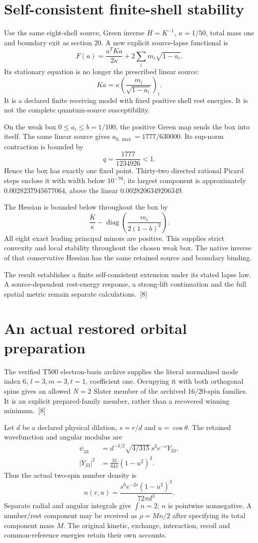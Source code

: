 \documentclass[10pt,twocolumn,letterpaper]{article}
\begin{document}
\section{Self-consistent finite-shell stability}
Use the same eight-shell source, Green inverse $H=K^{-1}$, $\kappa=1/50$, total mass one and boundary exit as section 20. A new explicit source-lapse functional is
\[
F(a)=\frac{a^TKa}{2\kappa}+2\sum_i m_i\sqrt{1-a_i}.
\]
Its stationary equation is no longer the prescribed linear source:
\[
Ka=\kappa\left(\frac{m_i}{\sqrt{1-a_i}}\right)_i.
\]
It is a declared finite receiving model with fixed positive shell rest energies. It is not the complete quantum-source susceptibility.

On the weak box $0\leq a_i\leq b=1/100$, the positive Green map sends the box into itself. The same linear source gives $a_{0,\max}=1777/630000$. Its sup-norm contraction is bounded by
\[
q=\frac{1777}{1234926}<1.
\]
Hence the box has exactly one fixed point. Thirty-two directed rational Picard steps enclose it with width below $10^{-70}$; its largest component is approximately $0.0028237945677064$, above the linear $0.0028206349206349$.

The Hessian is bounded below throughout the box by
\[
\frac K\kappa-\operatorname{diag}\left(\frac{m_i}{2(1-b)^2}\right).
\]
All eight exact leading principal minors are positive. This supplies strict convexity and local stability throughout the chosen weak box. The native inverse of that conservative Hessian has the same retained source and boundary binding.

The result establishes a finite self-consistent extension under its stated lapse law. A source-dependent rest-energy response, a strong-lift continuation and the full spatial metric remain separate calculations.~[8]

\section{An actual restored orbital preparation}
The verified T500 electron-basis archive supplies the literal normalized mode index 6, $l=3,m=3,t=1$, coefficient one. Occupying it with both orthogonal spins gives an allowed $N=2$ Slater member of the archived 16/20-spin families. It is an explicit prepared-family member, rather than a recovered winning minimum.~[8]

Let $d$ be a declared physical dilation, $s=r/d$ and $u=\cos\theta$. The retained wavefunction and angular modulus are
\[
\begin{aligned}
\psi_{33}&=d^{-3/2}\sqrt{4/315}\,s^3e^{-s}Y_{33},\\
|Y_{33}|^2&=\frac{35}{64\pi}(1-u^2)^3.
\end{aligned}
\]
Thus the actual two-spin number density is
\[
n(r,u)=\frac{s^6e^{-2s}(1-u^2)^3}{72\pi d^3}.
\]
Separate radial and angular integrals give $\int n=2$; $n$ is pointwise nonnegative. A number/rest component may be received as $\rho=Mn/2$ after specifying its total component mass $M$. The original kinetic, exchange, interaction, recoil and common-reference energies retain their own accounts.
\end{document}
